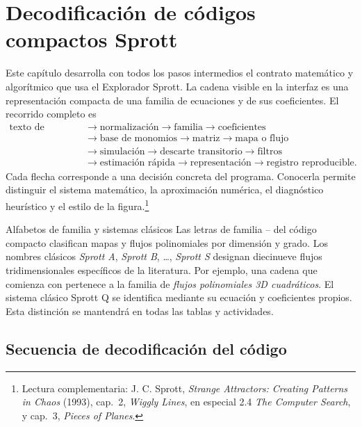 \section{Decodificación de códigos compactos Sprott}

Este capítulo desarrolla con todos los pasos intermedios el contrato matemático y
algorítmico que usa el Explorador Sprott. La cadena visible en la interfaz es una
representación compacta de una familia
de ecuaciones y de sus coeficientes. El recorrido completo es
\[
\begin{aligned}
\text{texto de entrada}
&\longrightarrow \text{normalización}
\longrightarrow \text{familia}
\longrightarrow \text{coeficientes}\\
&\longrightarrow \text{base de monomios}
\longrightarrow \text{matriz}
\longrightarrow \text{mapa o flujo}\\
&\longrightarrow \text{simulación}
\longrightarrow \text{descarte transitorio}
\longrightarrow \text{filtros}\\
&\longrightarrow \text{estimación rápida}
\longrightarrow \text{representación}
\longrightarrow \text{registro reproducible}.
\end{aligned}
\]
Cada flecha corresponde a una decisión concreta del programa. Conocerla permite
distinguir el sistema matemático, la aproximación numérica, el diagnóstico heurístico
y el estilo de la figura.\footnote{Lectura complementaria: J. C. Sprott,
\emph{Strange Attractors: Creating Patterns in Chaos} (1993), cap.~2,
\emph{Wiggly Lines}, en especial 2.4 \emph{The Computer Search}, y cap.~3,
\emph{Pieces of Planes}.}

\begin{idea}{Alfabetos de familia y sistemas clásicos}
Las letras de familia -- del código compacto clasifican mapas y
flujos polinomiales por dimensión y grado. Los nombres clásicos \emph{Sprott A},
\emph{Sprott B}, \ldots, \emph{Sprott S} designan diecinueve flujos tridimensionales
específicos de la literatura. Por ejemplo, una cadena que comienza con 
pertenece a la familia de \emph{flujos polinomiales 3D cuadráticos}. El sistema clásico
Sprott Q se identifica mediante su ecuación y coeficientes propios. Esta distinción se mantendrá en todas las
tablas y actividades.
\end{idea}

\subsection{Secuencia de decodificación del código}

